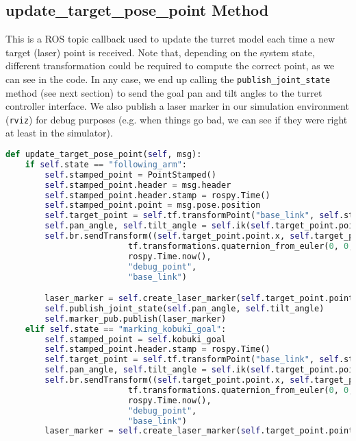 \subsection*{update\_target\_pose\_point Method}
This is a ROS topic callback used to update the turret model each time a new target (laser) point is received. Note that, depending on the system state, different transformation could be required to compute the correct point, as we can see in the code. In any case, we end up calling the \texttt{publish\_joint\_state} method (see next section) to send the goal pan and tilt angles to the turret controller interface. We also publish a laser marker in our simulation environment (\texttt{rviz}) for debug purposes (e.g. when things go bad, we can see if they were right at least in the simulator).
\begin{lstlisting}[caption={Update Target Pose Point},label={lst:updatetargetpose},language=Python]
def update_target_pose_point(self, msg):
    if self.state == "following_arm":
        self.stamped_point = PointStamped()
        self.stamped_point.header = msg.header
        self.stamped_point.header.stamp = rospy.Time()
        self.stamped_point.point = msg.pose.position
        self.target_point = self.tf.transformPoint("base_link", self.stamped_point)
        self.pan_angle, self.tilt_angle = self.ik(self.target_point.point.x, self.target_point.point.y, self.target_point.point.z)
        self.br.sendTransform((self.target_point.point.x, self.target_point.point.y, self.target_point.point.z),
                         tf.transformations.quaternion_from_euler(0, 0, 0),
                         rospy.Time.now(),
                         "debug_point",
                         "base_link")

        laser_marker = self.create_laser_marker(self.target_point.point)
        self.publish_joint_state(self.pan_angle, self.tilt_angle)
        self.marker_pub.publish(laser_marker)
    elif self.state == "marking_kobuki_goal":
        self.stamped_point = self.kobuki_goal
        self.stamped_point.header.stamp = rospy.Time()
        self.target_point = self.tf.transformPoint("base_link", self.stamped_point)
        self.pan_angle, self.tilt_angle = self.ik(self.target_point.point.x, self.target_point.point.y, self.target_point.point.z)
        self.br.sendTransform((self.target_point.point.x, self.target_point.point.y, self.target_point.point.z),
                         tf.transformations.quaternion_from_euler(0, 0, 0),
                         rospy.Time.now(),
                         "debug_point",
                         "base_link")
        laser_marker = self.create_laser_marker(self.target_point.point)
        

\end{lstlisting}
